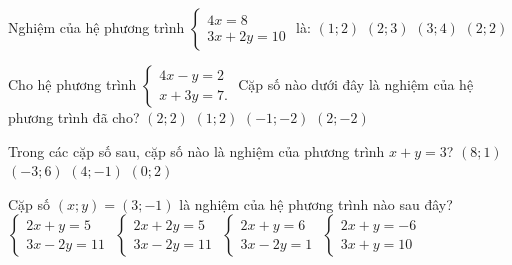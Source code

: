 \documentclass[12pt,a4paper]{article}
\begin{document}
\begin{ex}
Nghiệm của hệ phương trình $\begin{cases} 4x = 8 \\ 3x + 2y = 10 \end{cases}$ là:
\choice
{$(1; 2)$}
{$(2; 3)$}
{$(3; 4)$}
{\True $(2; 2)$}
\end{ex}

\begin{ex}
Cho hệ phương trình $\begin{cases} 4x - y = 2 \\ x + 3y = 7. \end{cases}$ Cặp số nào dưới đây là nghiệm của hệ phương trình đã cho?
\choice
{$(2; 2)$}
{\True $(1; 2)$}
{$(-1; -2)$}
{$(2; -2)$}
\end{ex}

\begin{ex}
Trong các cặp số sau, cặp số nào là nghiệm của phương trình $x + y = 3$?
\choice
{$(8; 1)$}
{$(-3; 6)$}
{\True $(4; -1)$}
{$(0; 2)$}
\end{ex}

\begin{ex}
Cặp số $(x; y) = (3; -1)$ là nghiệm của hệ phương trình nào sau đây?
\choice
{\True $\begin{cases} 2x + y = 5 \\ 3x - 2y = 11 \end{cases}$}
{$\begin{cases} 2x + 2y = 5 \\ 3x - 2y = 11 \end{cases}$}
{$\begin{cases} 2x + y = 6 \\ 3x - 2y = 1 \end{cases}$}
{$\begin{cases} 2x + y = -6 \\ 3x + y = 10 \end{cases}$}
\end{ex}
\end{document}
